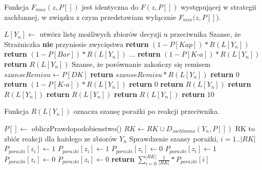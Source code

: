 Funkcja $F_{max}(z, P[])$ jest identyczna do $F(z, P[])$ występującej w strategii zachłannej, w związku z czym przedstawiam wyłącznie $F_{min}(z, P[]$).
\begin{algorithmic}[1]
		\State $L[Y_n] \gets$ utwórz listę możliwych zbiorów decyzji u przeciwnika 
			 \Comment Szanse, że Strażniczka \textbf{nie} przyniesie zwycięstwa
				\State \textbf{return} $ (1 - P[Kap]) * R(L[Y_n]) $
			\EndCase
				\State \textbf{return} $ (1 - P[Bar]) * R(L[Y_n]) $
			\EndCase
				\State ...
				\State \textbf{return} $ (1 - P[\textit{K-a}]) * R(L[Y_n]) $
			\EndCase
				\State \textbf{return} $  R(L[Y_n]) $
			\EndCase
				\Comment Szanse, że porównanie zakończy się remisem 
				\State $ szanseRemisu \gets P[DK]$ 
				\State \textbf{return} $ szanseRemisu * R(L[Y_n]) $
			\EndCase
				\State \textbf{return} $ 0 $
			\EndCase
				\State \textbf{return} $ (1 - P[\textit{K-a}]) * R(L[Y_n]) $
			\EndCase
					\State \textbf{return} $ 0 $
				\Else
					\State \textbf{return} $ R(L[Y_n]) $
				\EndIf
			\EndCase
				\State \textbf{return} $ R(L[Y_n]) $
			\EndCase
				\State \textbf{return} $ R(L[Y_n]) $
			\EndCase
				\State \textbf{return} $ R(L[Y_n]) $
			\EndCase
			\State \textbf{return} $ 10 $
			\EndCase
		\EndSwitch
	\EndFunction
\end{algorithmic}

Funkcja $R(L[Y_n])$ oznacza szansę porażki po reakcji przeciwnika.
\begin{algorithmic}[1]
			\State $P[] \gets$ obliczPrawdopodobienstwo()
			\State $RK \gets RK \cup D_{zachlanna}(Y_n, P[]) $	\Comment RK to zbiór reakcji dla każdego ze zbiorów $Y_n$
		\EndFor
			\Comment Sprawdzenie szansy porażki, $i=1..|RK|$
					\State $P_{porazki}[z_i] \gets 1$
				\EndCase
						\State $P_{porazki}[z_i] \gets 1$
					\Else
						\State $P_{porazki}[z_i] \gets 0$
					\EndIf
				\EndCase
						\State $P_{porazki}[z_i] \gets 1$
					\Else
						\State $P_{porazki}[z_i] \gets 0$
					\EndIf
				\EndCase
					$P_{porazki}[z_i] \gets 0$
				\EndCase
			\EndSwitch
		\EndFor
		\State \textbf{return} $ \sum_{i=0}^{|RK|} \frac{1}{|RK|} * P_{porazki}[i] $
	\EndFunction
\end{algorithmic}


